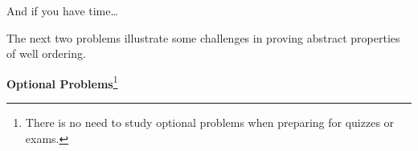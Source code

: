 \documentclass[handout]{mcs}
\begin{document}



\inhandout{\newpage}




\inhandout{\newpage}

And if you have time\dots

\begin{staffnotes}
The next two problems illustrate some challenges in proving abstract
properties of well ordering.  
\end{staffnotes}

\begin{center}
\textbf{Optional Problems}\footnote{There is no need to study optional
  problems when preparing for quizzes or exams.}
\end{center}



\end{document}
